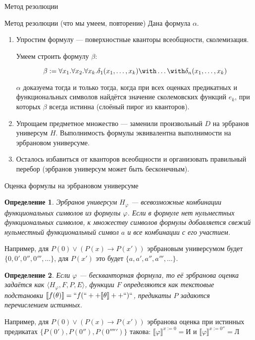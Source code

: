\documentclass[aspectratio=169]{beamer}
\newtheorem{dfn}{Определение}[section]
\begin{document}
\newcommand\doubleplus{+\kern-1.3ex+\kern0.8ex}
\newcommand\mdoubleplus{\ensuremath{\mathbin{+\mkern-10mu+}}}

\begin{frame}
\begin{center}\LARGE Метод резолюции\end{center}
\end{frame}

\begin{frame}{Метод резолюции (что мы умеем, повторение)}
Дана формула $\alpha$.
\begin{enumerate}
\item Упростим формулу --- поверхностные кванторы всеобщности, сколемизация.

Умеем строить формулу $\beta$:

$$\beta := \forall x_1.\forall x_2.\forall x_k.\delta_1(x_1,\dots,x_k)\with\dots\with\delta_n(x_1,\dots,x_k)$$

$\alpha$ доказуема тогда и только тогда, когда при всех оценках
предикатных и функциональных символов найдётся значение 
сколемовских функций $e_k$, при которых $\beta$ всегда истинна (слоёный пирог из кванторов).

\item Упрощаем предметное множество --- заменили произвольный $D$ на эрбранов универсум $H$. 
Выполнимость формулы эквивалентна выполнимости на эрбрановом универсуме.

\item Осталось избавиться от кванторов всеобщности и организовать правильный перебор
(эрбранов универсум может быть бесконечным).
\end{enumerate}
\end{frame}

\begin{frame}{Оценка формулы на эрбрановом универсуме}
\begin{dfn}
Эрбранов универсум $H_\varphi$ --- всевозможные комбинации функциональных символов из формулы $\varphi$.
Если в формуле нет нульместных функциональных символов, к множеству символов формулы добавляется 
свежий нульместный функциональный символ $a$ и все комбинации с его участием.
\end{dfn}

Например, для $P(0)\vee (P(x)\rightarrow P(x'))$ эрбрановым универсумом будет $\{0, 0', 0'', 0''', \dots\}$,
для $P(x')$ это будет $\{a,a',a'',a''',\dots\}$.

\begin{dfn} Если $\varphi$ --- бескванторная формула, то её эрбранова оценка задаётся как
$\langle H_\varphi, F, P, E\rangle$, функции $F$ определяются как текстовые подстановки
$\llbracket f(\theta)\rrbracket = ``f(`` ++ \llbracket \theta \rrbracket ++ ``)``$, предикаты $P$ задаются перечислением
истинных.
\end{dfn}

Например, для $P(0)\vee (P(x)\rightarrow P(x'))$ эрбранова оценка при истинных предикатах $\{P(0'), P(0''), P(0''''')\}$
такова: $\llbracket \varphi \rrbracket^{ x:=0 } = \text{И}$ и $\llbracket \varphi \rrbracket^{ x:=0'' } = \text{Л}$
\end{frame}
\end{document}
